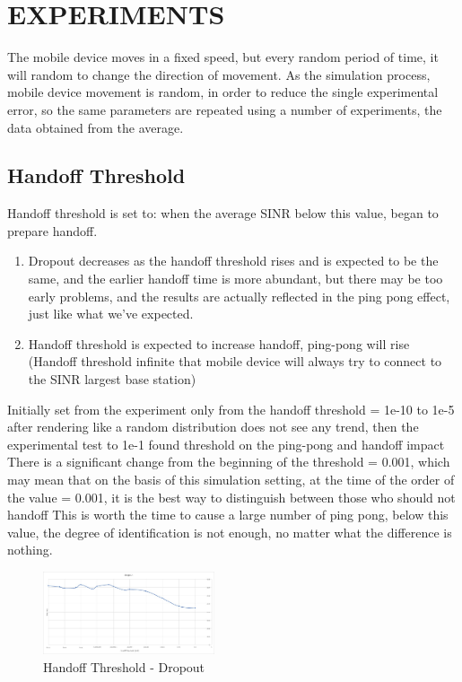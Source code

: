 \documentclass[a4paper]{IEEEtran}
\begin{document}
\section{\textbf{EXPERIMENTS}}

The mobile device moves in a fixed speed, but every random period of time, it will random to change the direction of movement. As the simulation process, mobile device movement is random, in order to reduce the single experimental error, so the same parameters are repeated using a number of experiments, the data obtained from the average.
\subsection{Handoff Threshold}
Handoff threshold is set to: when the average SINR below this value, began to prepare handoff.
\begin{enumerate}
\item{Dropout decreases as the handoff threshold rises and is expected to be the same, and the earlier handoff time is more abundant, but there may be too early problems, and the results are actually reflected in the ping pong effect, just like what we've expected.}
\item{Handoff threshold is expected to increase handoff, ping-pong will rise
(Handoff threshold infinite that mobile device will always try to connect to the SINR largest base station)}
\end{enumerate}
Initially set from the experiment only from the handoff threshold = 1e-10 to 1e-5 after rendering like a random distribution does not see any trend, then the experimental test to 1e-1 found threshold on the ping-pong and handoff impact There is a significant change from the beginning of the threshold = 0.001, which may mean that on the basis of this simulation setting, at the time of the order of the value = 0.001, it is the best way to distinguish between those who should not handoff This is worth the time to cause a large number of ping pong, below this value, the degree of identification is not enough, no matter what the difference is nothing.
\begin{figure}[h]
    \centering
    \includegraphics[width=0.45\textwidth]{handoffthreshold/dropout}
    \caption{Handoff Threshold - Dropout}
    \label{fig:mesh1}
\end{figure}
\end{document}
